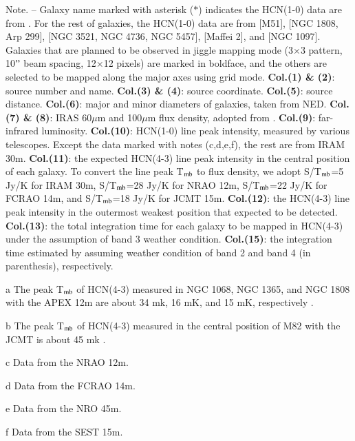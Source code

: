 \documentclass[legal,11pt]{article}
\begin{document}
\begin{table}
\begin{threeparttable}[b]
\begin{tablenotes}
Note. -- Galaxy name marked with asterisk ($\ast$) indicates the HCN(1-0) data
are from \citet{gs04a}. For the rest of galaxies, the HCN(1-0) data are from
\citet{Chen15} [M51], \citet{Baan08} [NGC 1808, Arp 299], \citet{usero15} [NGC 3521, NGC 4736, NGC
5457], \citet{Nguyen1992} [Maffei 2], and \citet{Kohno2003} [NGC 1097].
Galaxies that are planned to be observed in jiggle mapping mode (3$\times$3
pattern, 10$"$ beam spacing, 12$\times$12 pixels) are marked in boldface, and
the others are selected to be mapped along the major axes using grid mode.{\bf
Col.(1) \& (2)}: source number and name. {\bf Col.(3) \& (4)}: source
coordinate. {\bf Col.(5)}: source distance. {\bf Col.(6)}: major and minor
diameters of galaxies, taken from NED. {\bf Col.(7) \& (8)}:  IRAS 60$\mu$m and
100$\mu$m flux density, adopted from \citet{smk03}. {\bf Col.(9)}: far-infrared luminosity. {\bf Col.(10)}: HCN(1-0)
line peak intensity, measured by various telescopes. Except the data marked
with notes (c,d,e,f), the rest are from IRAM 30m.  {\bf Col.(11)}: the expected
HCN(4-3) line peak intensity in the central position of each galaxy. To convert
the line peak T$_{\rm mb}$ to flux density, we adopt S/T$_{\rm mb}$=5 Jy/K for
IRAM 30m, S/T$_{\rm mb}$=28 Jy/K for NRAO 12m, S/T$_{\rm mb}$=22 Jy/K for FCRAO
14m, and S/T$_{\rm mb}$=18 Jy/K for JCMT 15m. {\bf Col.(12)}: the HCN(4-3) line
peak intensity in the outermost weakest position that expected to be detected.
{\bf Col.(13)}: the total integration time for each galaxy to be mapped in
HCN(4-3) under the assumption of band 3 weather condition. {\bf Col.(15)}: the integration time estimated 
by assuming weather condition of band 2 and band 4 (in parenthesis), respectively. \\

\item[a]{The peak T$_{\rm mb}$ of HCN(4-3) measured in NGC 1068, NGC 1365, and NGC 1808 with the APEX 12m are about 34 mk, 16 mK, and 15 mK, respectively \citep{zgh2014}.}
\item[b]{The peak T$_{\rm mb}$ of HCN(4-3) measured in the central position of M82 with the JCMT is about 45 mk \citep{Seaquist2000}.}
\item[c]{Data from the NRAO 12m.}
\item[d]{Data from the FCRAO 14m.}
\item[e]{Data from the NRO 45m.}
\item[f]{Data from the SEST 15m.}

\end{tablenotes}
\end{threeparttable}

\end{table}
\end{document}
